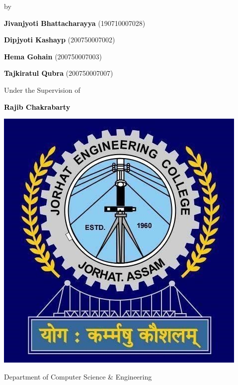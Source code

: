 \begin{titlepage}
\begin{center}
\vspace{5mm}
    {\large by\par}
    \vspace{0.05cm}
    {\large \textbf{\textcolor{black}{Jivanjyoti Bhattacharayya}}  (190710007028)\par} 
    {\large \textbf{\textcolor{black}{Dipjyoti Kashayp}}  (200750007002)\par} 
    {\large \textbf{\textcolor{black}{Hema Gohain}}  (200750007003)\par} 
    {\large \textbf{\textcolor{black}{Tajkiratul Qubra}}  (200750007007)\par} 
    \vspace{0.4cm}
    
    { Under the Supervision of \par}
    {\large \textbf{\textbf{\textcolor{black}{Rajib Chakrabarty}}}\par}
     \vspace{0.8 cm}

\includegraphics[width=0.25\linewidth]{Images/jec_logo.png}
     \vspace{0.6 cm}

    
    {\large Department of Computer Science \& Engineering\par}
    \vspace{0.4cm}


\end{center}
\end{titlepage}
